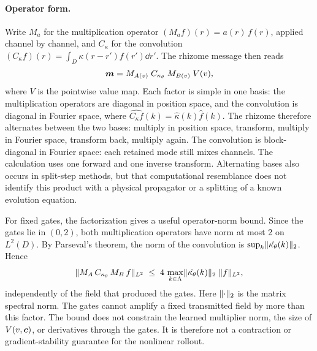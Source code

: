 \paragraph{Operator form.} Write $M_a$ for the multiplication operator $(M_a f)(r)=a(r)\,f(r)$, applied channel by channel, and $C_\kappa$ for the convolution $(C_\kappa f)(r)=\int_D\kappa(r-r')f(r')\dd r'$. The rhizome message then reads
\begin{equation}
  \label{eq:rhizome-operator-form}
  \bm{m} = M_{A(v)}\;C_{\kappa_\theta}\;M_{B(v)}\;V(v),
\end{equation}
where $V$ is the pointwise value map. Each factor is simple in one basis: the multiplication operators are diagonal in position space, and the convolution is diagonal in Fourier space, where $\widehat{C_\kappa f}(k)=\hat\kappa(k)\hat f(k)$. The rhizome therefore alternates between the two bases: multiply in position space, transform, multiply in Fourier space, transform back, multiply again. The convolution is block-diagonal in Fourier space: each retained mode still mixes channels. The calculation uses one forward and one inverse transform. Alternating bases also occurs in split-step methods, but that computational resemblance does not identify this product with a physical propagator or a splitting of a known evolution equation.

For fixed gates, the factorization gives a useful operator-norm bound. Since the gates lie in $(0,2)$, both multiplication operators have norm at most 2 on $L^2(D)$. By Parseval's theorem, the norm of the convolution is $\sup_k\lVert\hat{\kappa_\theta}(k)\rVert_2$. Hence
\begin{equation}
  \label{eq:rhizome-bound}
  \lVert M_{A}\,C_{\kappa_\theta}\,M_{B}\,f\rVert_{L^2} \;\le\; 4\,\max_{k\in\Lambda}\lVert\hat{\kappa_\theta}(k)\rVert_2\;\lVert f\rVert_{L^2},
\end{equation}
independently of the field that produced the gates. Here $\lVert\cdot\rVert_2$ is the matrix spectral norm. The gates cannot amplify a fixed transmitted field by more than this factor. The bound does not constrain the learned multiplier norm, the size of $V(v,\bm{c})$, or derivatives through the gates. It is therefore not a contraction or gradient-stability guarantee for the nonlinear rollout.

